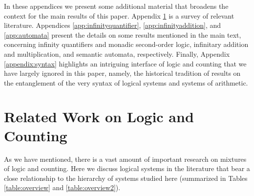 \documentclass[12pt,oneside,reqno]{amsart}
\theoremstyle{definition}
\begin{document}













\newpage

\appendix

In these appendices we present some additional material that broadens the context for the main results of this paper.  Appendix \ref{app:related} is a survey of relevant literature. Appendices \ref{app:infinityquantifier}, \ref{app:infinityaddition}, and \ref{app:automata} present the details on some results mentioned in the main text, concerning infinity quantifiers and monadic second-order logic, infinitary addition and multiplication, and semantic automata, respectively. Finally, Appendix \ref{appendix:syntax} highlights an  intriguing interface  of logic and counting that we have largely ignored in this paper, namely, the historical tradition of results on the entanglement of the very syntax of logical systems and systems of arithmetic.

\renewcommand\thesection{\Alph{section}}

\section{Related Work on Logic and Counting} \label{app:related} 
As we have mentioned, there is a vast amount of important research on mixtures of logic and counting. Here we discuss logical systems  in the literature that bear a close relationship to the hierarchy of systems studied here (summarized in Tables \ref{table:overview} and \ref{table:overview2}).
\end{document}
